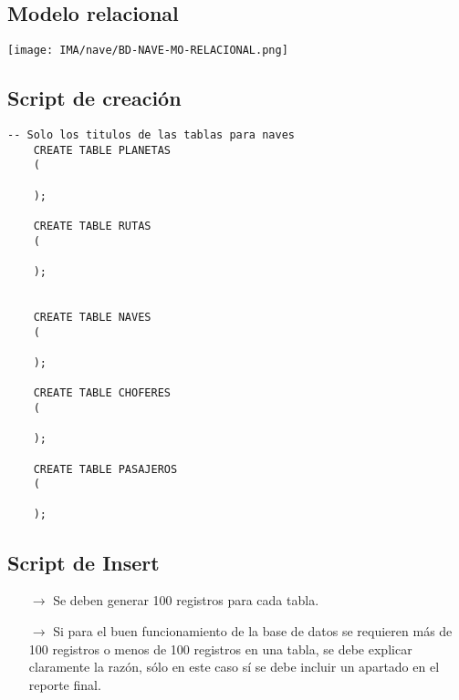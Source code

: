 \subsection{Modelo relacional}
\begin{center}
  \texttt{[image: IMA/nave/BD-NAVE-MO-RELACIONAL.png]}
\end{center}


\subsection{Script de creación}
\begin{lstlisting}[caption={Tablas para la BdDatos}, label={lst:sql_estadios}]
    -- Solo los titulos de las tablas para naves    
    CREATE TABLE PLANETAS
    (
      
    );
    
    CREATE TABLE RUTAS
    (

    );
    
    
    CREATE TABLE NAVES
    (
      
    );
    
    CREATE TABLE CHOFERES
    (
      
    );
    
    CREATE TABLE PASAJEROS
    (

    );
\end{lstlisting}

\subsection{Script de Insert}
\begin{itemize}
    \item[$\rightarrow$] Se deben generar 100 registros para cada tabla.
    \item[$\rightarrow$] Si para el buen funcionamiento de la base de datos se requieren más de 100 registros o
            menos de 100 registros en una tabla, se debe explicar claramente la razón, sólo en este caso
            sí se debe incluir un apartado en el reporte final.
\end{itemize}

